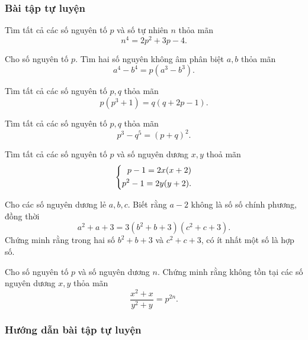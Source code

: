 \subsubsection*{Bài tập tự luyện}

\begin{btt}
Tìm tất cả các số nguyên tố $p$ và số tự nhiên $n$ thỏa mãn
\[n^4=2p^2+3p-4.\]
\end{btt}

\begin{btt}
Cho số nguyên tố $p$. Tìm hai số nguyên không âm phân biệt $a,b$ thỏa mãn \[a^4-b^4=p\left(a^3-b^3\right).\]
\end{btt}

\begin{btt}
Tìm tất cả các số nguyên tố $p,q$ thỏa mãn $$p\left(p^3+1\right)=q\left(q+2p-1\right).$$
\end{btt}

\begin{btt}
Tìm tất cả các số nguyên tố $p,q$ thỏa mãn $$p^3-q^5=(p+q)^2.$$
\end{btt}

\begin{btt}
Tìm tất cả các số nguyên tố $p$ và số nguyên dương $x, y$ thoả mãn
\[\left\{\begin{aligned}p-1=2x(x+2) \\ p^2-1=2y(y+2).\end{aligned}\right.\]
\end{btt}

\begin{btt}
Cho các số nguyên dương lẻ $a, b, c$. Biết rằng $a-2$ không là số số chính phương, đồng thời
$$a^{2}+a+3=3\left(b^{2}+b+3\right)\left(c^{2}+c+3\right).$$
Chứng minh rằng trong hai số $b^{2}+b+3$ và $c^{2}+c+3$, có ít nhất một số là hợp số.
\end{btt}

\begin{btt}
Cho số nguyên tố $p$ và số nguyên dương $n.$ Chứng minh rằng không tồn tại các số nguyên dương $x,y$ thỏa mãn
\[\dfrac{x^2+x}{y^2+y}=p^{2n}.\]
\end{btt}

\subsubsection*{Hướng dẫn bài tập tự luyện}

